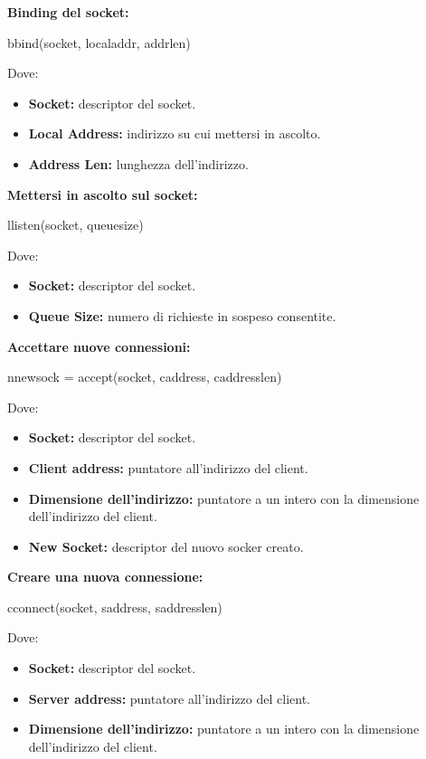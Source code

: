 \vspace*{0.02\textheight}
\textbf{Binding del socket:}
\begin{cbox}
bbind(socket, localaddr, addrlen)
\end{cbox}
Dove:
\begin{itemize}
    \item \textbf{Socket:} descriptor del socket.
    \item \textbf{Local Address:} indirizzo su cui mettersi in ascolto.
    \item \textbf{Address Len:} lunghezza dell'indirizzo.
\end{itemize}

\vspace*{0.02\textheight}
\textbf{Mettersi in ascolto sul socket:}
\begin{cbox}
llisten(socket, queuesize)
\end{cbox}
Dove:
\begin{itemize}
    \item \textbf{Socket:} descriptor del socket.
    \item \textbf{Queue Size:} numero di richieste in sospeso consentite.
\end{itemize}

\vspace*{0.02\textheight}
\textbf{Accettare nuove connessioni:}
\begin{cbox}
nnewsock = accept(socket, caddress, caddresslen)
\end{cbox}
Dove:
\begin{itemize}
    \item \textbf{Socket:} descriptor del socket.
    \item \textbf{Client address:} puntatore all'indirizzo del client.
    \item \textbf{Dimensione dell'indirizzo:} puntatore a un intero con la dimensione dell'indirizzo del client.
    \item \textbf{New Socket:} descriptor del nuovo socker creato.
\end{itemize}

\vspace*{0.02\textheight}
\textbf{Creare una nuova connessione:}
\begin{cbox}
cconnect(socket, saddress, saddresslen)
\end{cbox}
Dove:
\begin{itemize}
    \item \textbf{Socket:} descriptor del socket.
    \item \textbf{Server address:} puntatore all'indirizzo del client.
    \item \textbf{Dimensione dell'indirizzo:} puntatore a un intero con la dimensione dell'indirizzo del client.
\end{itemize}

